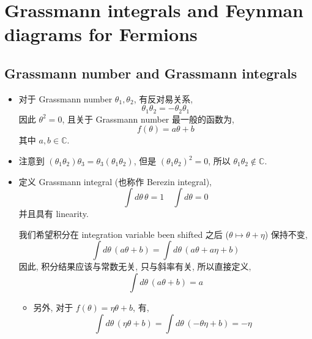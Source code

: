 \chapter{Grassmann integrals and Feynman diagrams for Fermions}
\section{Grassmann number and Grassmann integrals}
\begin{itemize}
	\item 对于 Grassmann number $\theta_1, \theta_2$, 有反对易关系,
	\begin{equation}
		\theta_1 \theta_2 = - \theta_2 \theta_1
	\end{equation}
	因此 $\theta^2 = 0$, 且关于 Grassmann number 最一般的函数为,
	\begin{equation}
		f(\theta) = a \theta + b
	\end{equation}
	其中 $a, b \in \mathbb{C}$.
	
	\item 注意到 $(\theta_1 \theta_2) \theta_3 = \theta_3 (\theta_1 \theta_2)$, 但是 $(\theta_1 \theta_2)^2 = 0$, 所以 $\theta_1 \theta_2 \notin \mathbb{C}$.
	
	\item 定义 Grassmann integral (也称作 Berezin integral),
	\begin{equation}
		\int d\theta \, \theta = 1 \quad \int d\theta = 0
	\end{equation}
	并且具有 linearity.
	
	\begin{tcolorbox}[title=comment:]
		我们希望积分在 integration variable been shifted 之后 ($\theta \mapsto \theta + \eta$) 保持不变,
		\begin{equation}
			\int d\theta \, (a \theta + b) = \int d\theta \, (a \theta + a \eta + b)
		\end{equation}
		因此, 积分结果应该与常数无关, 只与斜率有关, 所以直接定义,
		\begin{equation}
			\int d\theta \, (a \theta + b) = a
		\end{equation}
	\end{tcolorbox}
	
	\begin{itemize}
		\item 另外, 对于 $f(\theta) = \eta \theta + b$, 有,
		\begin{equation}
			\int d\theta \, (\eta \theta + b) = \int d\theta \, (- \theta \eta + b) = - \eta
		\end{equation}
	\end{itemize}
\end{itemize}

